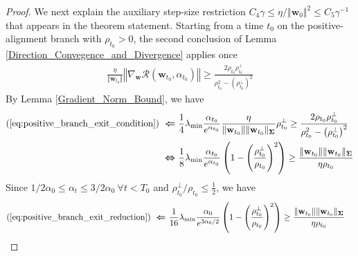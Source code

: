 \documentclass[pdflatex,sn-basic]{sn-jnl}%
\theoremstyle{thmstyleone}%
\begin{document}
\begin{appendices}
\begin{proof}
  We next explain the auxiliary step-size restriction $C_4 \gamma \le \eta / \Vert \mathbf{w}_0 \Vert^2 \le C_5 \gamma^{-1}$ that appears in the theorem statement. Starting from a time $t_0$ on the positive-alignment branch with $\rho_{t_0} > 0$, the second conclusion of Lemma \ref{Direction_Convegence_and_Divergence} applies once
  \begin{equation}\label{eq:positive_branch_exit_condition}
  \begin{aligned}
    \frac{\eta }{\Vert \mathbf{w}_{t_0} \Vert} 
      \left\Vert 
        \nabla_{\mathbf{w}} \mathcal{R} \left(\mathbf{w}_{t_0}, \alpha_{t_0}\right)
      \right\Vert
      \ge
      \frac{2  {\rho}_{t_0} {\rho}_{t_0}^{\perp}}{
        {\rho}_{t_0}^2 
        - \left({\rho}_{t_0}^{\perp}\right)^2
      }
  \end{aligned}
  \end{equation}
  By Lemma \ref{Gradient_Norm_Bound}, we have
  \begin{equation}\label{eq:positive_branch_exit_reduction}
  \begin{aligned}
    (\ref{eq:positive_branch_exit_condition}) 
    \ \boldsymbol{\Leftarrow} \ &
    \frac{1}{4}
    \lambda_{\min}
    \frac{\alpha_{t_0}}{e^{\alpha_{t_0}}}
    \frac{\eta}{\Vert \mathbf{w}_{t_0} \Vert \Vert \mathbf{w}_{t_0} \Vert_{\mathbf{\Sigma}}}
    \rho_{t_0}^{\perp}
    \ge
    \frac{2  {\rho}_{t_0} {\rho}_{t_0}^{\perp}}{
      {\rho}_{t_0}^2 
      - \left({\rho}_{t_0}^{\perp}\right)^2
    }
    \\ \ \boldsymbol{\Leftrightarrow} \ &
    \frac{1}{8}
    \lambda_{\min}
    \frac{\alpha_{t_0} }{e^{\alpha_{t_0}}}
    \left(
      1
      - 
      \left( \frac{{\rho}_{t_0}^{\perp}}{{\rho}_{t_0}}\right)^2
    \right)
    \ge
    \frac{\Vert \mathbf{w}_{t_0} \Vert \Vert \mathbf{w}_{t_0} \Vert_{\mathbf{\Sigma}}}{\eta \rho_{t_0}}
  \end{aligned}
  \end{equation}
  Since $1/2 \alpha_0 \le \alpha_{t} \le 3/2 \alpha_0 \ \forall t < T_0$ and $\rho_{t_0}^{\perp} / \rho_{t_0} \le \frac{1}{2}$, we have 
  \begin{equation}\label{eq:positive_branch_exit_alpha_reduction}
  \begin{aligned}
    (\ref{eq:positive_branch_exit_reduction}) 
    \ \boldsymbol{\Leftarrow} \ &
    \frac{1}{16}
    \lambda_{\min}
    \frac{\alpha_0 }{e^{3 \alpha_0 / 2 }}
    \left(
      1
      - 
      \left( \frac{{\rho}_{t_0}^{\perp}}{{\rho}_{t_0}}\right)^2
    \right)
    \ge
    \frac{\Vert \mathbf{w}_{t_0} \Vert \Vert \mathbf{w}_{t_0} \Vert_{\mathbf{\Sigma}}}{\eta \rho_{t_0}}

\end{aligned}
\end{equation}
\end{proof}
\end{appendices}
\end{document}
